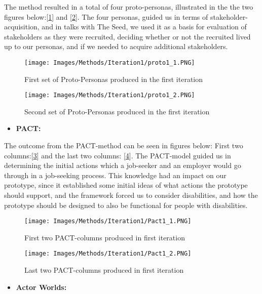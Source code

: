 The method resulted in a total of four proto-personas, illustrated in the the two figures below:[\ref{Proto1_1}] and [\ref{Proto1_2}]. The four personas, guided us in terms of stakeholder-acquisition, and in talks with The Seed, we used it as a basis for evaluation of stakeholders as they were recruited, deciding whether or not the recruited lived up to our personas, and if we needed to acquire additional stakeholders.

\begin{figure}[H]
\caption{First set of Proto-Personas produced in the first iteration}
\centering
\label{Proto1_1}
\texttt{[image: Images/Methods/Iteration1/proto1\_1.PNG]}
\end{figure}

\begin{figure}[H]
\caption{Second set of Proto-Personas produced in the first iteration}
\centering
\label{Proto1_2}
\texttt{[image: Images/Methods/Iteration1/proto1\_2.PNG]}
\end{figure}

\begin{itemize}
    \item \bf{PACT:}
\end{itemize}

The outcome from the PACT-method can be seen in figures below: First two columns:[\ref{PACT1_1}] and the last two columns: [\ref{PACT1_2}]. The PACT-model guided us in determining the initial actions which a job-seeker and an employer would go through in a job-seeking process. This knowledge had an impact on our prototype, since it established some initial ideas of what actions the prototype should support, and the framework forced us to consider disabilities, and how the prototype should be designed to also be functional for people with disabilities. 

\begin{figure}[H]
\caption{First two PACT-columns produced in first iteration}
\centering
\label{PACT1_1}
\texttt{[image: Images/Methods/Iteration1/Pact1\_1.PNG]}
\end{figure}

\begin{figure}[H]
\caption{Last two PACT-columns produced in first iteration}
\centering
\label{PACT1_2}
\texttt{[image: Images/Methods/Iteration1/Pact1\_2.PNG]}
\end{figure}

\begin{itemize}
    \item \bf{Actor Worlds:}
\end{itemize}

